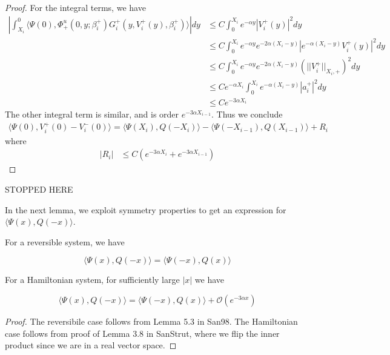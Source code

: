 \documentclass[thesis.tex]{subfiles}
\begin{document}
\begin{lemma}
\begin{proof}
For the integral terms, we have
\begin{align*}
\left| \int_{X_i}^0 \langle \Psi(0), \Phi_+^u(0, y; \beta_i^+) G_i^+(y, V_i^+(y),\beta_i^+) \rangle \right| dy &\leq C \int_0^{X_i} e^{-\alpha y} |V_i^+(y)|^2 dy \\
&\leq C \int_0^{X_i} e^{-\alpha y} e^{-2 \alpha(X_i - y)}|e^{-\alpha (X_i - y)} V_i^+(y)|^2 dy \\
&\leq C \int_0^{X_i} e^{-\alpha y} e^{-2 \alpha(X_i - y)}(||V_i^+||_{X_i, +})^2 dy \\
&\leq C e^{-\alpha X_i} \int_0^{X_i} e^{-\alpha (X_i - y)} |a_i^+|^2 dy \\
&\leq C e^{-3 \alpha X_i}
\end{align*}
The other integral term is similar, and is order $e^{-3 \alpha X_{i-1}}$. Thus we conclude
\begin{align*}
\langle \Psi(0), V_i^+(0) - V_i^-(0) \rangle = 
\langle \Psi(X_i), Q(-X_i) \rangle - \langle \Psi(-X_{i-1}), Q(X_{i-1}) \rangle + R_i
\end{align*}
where 
\begin{align*}
|R_i| &\leq C( e^{-3 \alpha X_i} +  e^{-3 \alpha X_{i-1}})
\end{align*}
\end{proof}
\end{lemma}

STOPPED HERE

In the next lemma, we exploit symmetry properties to get an expression for $\langle \Psi(x), Q(-x) \rangle$.


\begin{lemma}\label{otherIP}

For a reversible system, we have

\begin{equation}
\langle \Psi(x), Q(-x) \rangle = \langle \Psi(-x), Q(x) \rangle
\end{equation}

For a Hamiltonian system, for sufficiently large $|x|$ we have

\begin{equation}
\langle \Psi(x), Q(-x) \rangle = \langle \Psi(-x), Q(x) \rangle
+ \mathcal{O}(e^{-3 \alpha x})
\end{equation}

\begin{proof}
The reversibile case follows from Lemma 5.3 in San98. The Hamiltonian case follows from proof of Lemma 3.8 in SanStrut, where we flip the inner product since we are in a real vector space. 
\end{proof}
\end{lemma}
\end{document}
